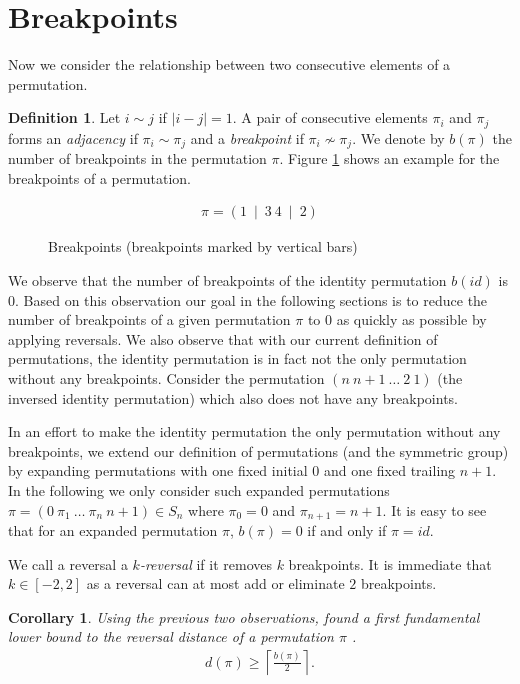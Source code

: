 \documentclass[11pt,DIV=11]{scrartcl}
\newtheorem{corollary}{Corollary}[theorem]
\theoremstyle{definition}
\newtheorem{definition}[theorem]{Definition}
\theoremstyle{remark}
\begin{document}
\section{Breakpoints}
\label{sec:breakpoints}

Now we consider the relationship between two consecutive elements of a permutation.

\begin{definition}
Let $i \sim j$ if $|i - j| = 1$. A pair of consecutive elements $\pi_i$ and $\pi_j$ forms an \textit{adjacency} if $\pi_i \sim \pi_j$ and a \textit{breakpoint} if $\pi_i \not\sim \pi_j$. We denote by $b(\pi)$ the number of breakpoints in the permutation $\pi$. Figure \ref{fig:breakpoints} shows an example for the breakpoints of a permutation.
\end{definition}

\begin{figure}
    \begin{align*}
        \pi = (1\ \mid\ 3\ 4\ \mid\ 2)
    \end{align*}
    \caption{Breakpoints (breakpoints marked by vertical bars)}
    \label{fig:breakpoints}
\end{figure}

We observe that the number of breakpoints of the identity permutation $b(id)$ is $0$. Based on this observation our goal in the following sections is to reduce the number of breakpoints of a given permutation $\pi$ to $0$ as quickly as possible by applying reversals. We also observe that with our current definition of permutations, the identity permutation is in fact not the only permutation without any breakpoints. Consider the permutation $(n\ n+1\ \dots\ 2\ 1)$ (the inversed identity permutation) which also does not have any breakpoints.

In an effort to make the identity permutation the only permutation without any breakpoints, we extend our definition of permutations (and the symmetric group) by expanding permutations with one fixed initial $0$ and one fixed trailing $n+1$. In the following we only consider such expanded permutations $\pi = (0\ \pi_1\ \dots\ \pi_n\ n+1) \in S_n$ where $\pi_0 = 0$ and $\pi_{n+1} = n+1$. It is easy to see that for an expanded permutation $\pi$, $b(\pi) = 0$ if and only if $\pi = id$.

We call a reversal a \textit{$k$-reversal} if it removes $k$ breakpoints. It is immediate that $k \in [-2,2]$ as a reversal can at most add or eliminate $2$ breakpoints.

\begin{corollary}
Using the previous two observations, \citeauthor*{Kececioglu1995} found a first fundamental lower bound to the reversal distance of a permutation $\pi$ \cite{Kececioglu1995}.
\begin{align*}
    d(\pi) \geq \left\lceil \frac{b(\pi)}{2} \right\rceil.
\end{align*}
\end{corollary}
\end{document}
